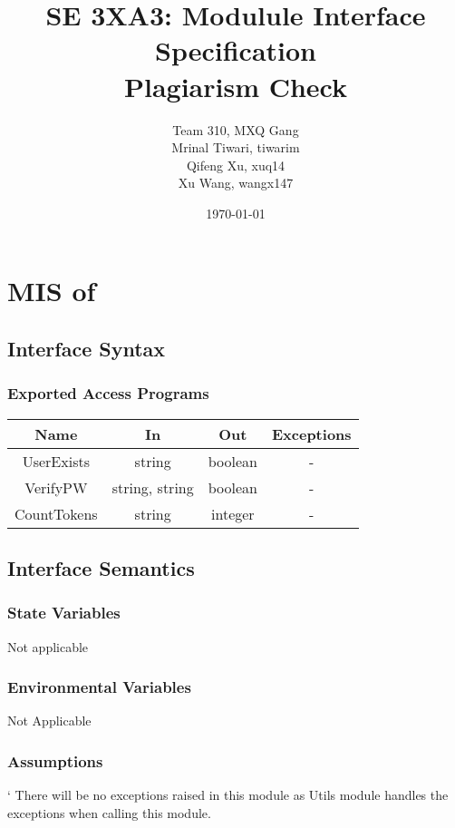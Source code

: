 \documentclass[12,english]{article}
\title{SE 3XA3: Modulule Interface Specification\\Plagiarism Check}
\author{Team 310, MXQ Gang
        \\ Mrinal Tiwari, tiwarim
		\\ Qifeng Xu, xuq14
		\\ Xu Wang, wangx147
}
\date{\today}
\begin{document}
\maketitle
\newpage
\tableofcontents
\newpage





	
\section{MIS of }
		\subsection{Interface Syntax}
			\subsubsection{Exported Access Programs}
				\begin{tabular}[pos]{|c|c|c|c|}
					
					\hline
					\textbf{Name}& \textbf{In} & \textbf{Out} & \textbf{Exceptions} \\ \hline
					UserExists & string & boolean & - \\ \hline
					VerifyPW & string, string & boolean & -\\ \hline
					CountTokens & string & integer & -\\ \hline
					
				\end{tabular}
				
		\subsection{Interface Semantics}
			\subsubsection{State Variables}
			Not applicable
			
			\subsubsection{Environmental Variables}
			Not Applicable
			
			\subsubsection{Assumptions}
        `   There will be no exceptions raised in this module as Utils module handles the exceptions when calling this module.
        
\end{document}
